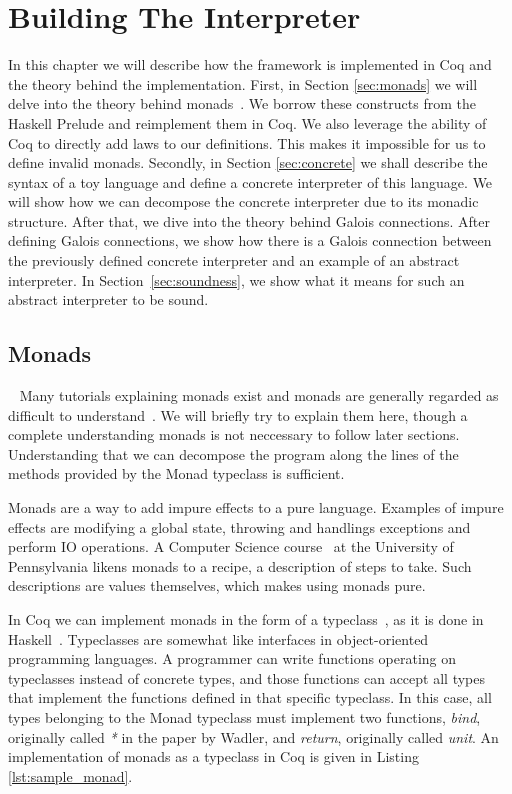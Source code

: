 \chapter{Building The Interpreter}
In this chapter we will describe how the framework is implemented in Coq and
the theory behind the implementation. First, in Section \ref{sec:monads} 
we will delve into the theory
behind monads~\cite{wadler1995monads}. We borrow these constructs from the 
Haskell Prelude and reimplement them in Coq. We also leverage the ability of
Coq to directly add laws to our definitions. This makes it impossible for us to
define invalid monads. Secondly, in Section \ref{sec:concrete} we shall describe the 
syntax of a toy language and define a concrete interpreter of this language. We
will show how we can decompose the concrete interpreter due to its monadic
structure. After that, we dive into the theory behind Galois connections. 
After defining Galois connections, we show how there is a Galois connection
between the previously defined concrete interpreter and an example of an
abstract interpreter.
In Section~\ref{sec:soundness}, we show what it means for such an abstract
interpreter to be sound. 

\section{Monads}~\label{sec:monads}
Many tutorials explaining monads exist and monads are generally regarded as
difficult to understand~\cite{petricek2018we}. We will briefly try to explain
them here, though a complete understanding monads is not neccessary to follow 
later sections. Understanding that we can decompose the program along the 
lines of the methods provided by the Monad typeclass is sufficient.

Monads are a way to add impure effects to a pure language. Examples of impure
effects are modifying a global state, throwing and handlings exceptions and
perform IO operations. A Computer Science course~\cite{upenn_monads} at the University of
Pennsylvania likens monads to a recipe, a description of steps to take. Such
descriptions are values themselves, which makes using monads pure.

In Coq we can implement monads in the form of a typeclass~\cite{sozeau2008first}, 
as it is done in Haskell~\cite{wadler1995monads}. Typeclasses are somewhat like interfaces in 
object-oriented programming languages. A programmer can write functions 
operating on typeclasses instead of concrete types, and those functions can
accept all types that implement the functions defined in that specific typeclass. 
In this case, all types belonging to the Monad typeclass must implement two functions,
\textit{bind}, originally called \textit{*} in the paper by Wadler, and 
\textit{return}, originally called \textit{unit}. An implementation of monads
as a typeclass in Coq is given in Listing \ref{lst:sample_monad}.

